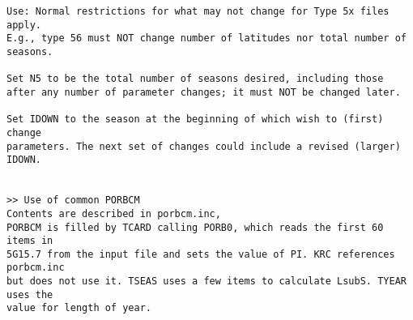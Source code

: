 \begin{verbatim}
Use: Normal restrictions for what may not change for Type 5x files apply.
E.g., type 56 must NOT change number of latitudes nor total number of seasons.

Set N5 to be the total number of seasons desired, including those
after any number of parameter changes; it must NOT be changed later.

Set IDOWN to the season at the beginning of which wish to (first) change
parameters. The next set of changes could include a revised (larger) IDOWN.


>> Use of common PORBCM
Contents are described in porbcm.inc, 
PORBCM is filled by TCARD calling PORB0, which reads the first 60 items in 
5G15.7 from the input file and sets the value of PI. KRC references porbcm.inc 
but does not use it. TSEAS uses a few items to calculate LsubS. TYEAR uses the 
value for length of year.

\end{verbatim}